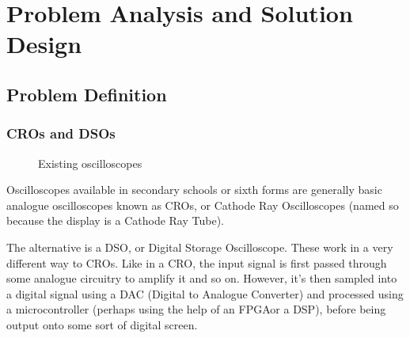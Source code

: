 \chapter{Problem Analysis and Solution Design}
\section{Problem Definition}
\subsection*{CROs and DSOs}

\begin{figure}[h]
  \centering
  \hfill
  \caption{Existing oscilloscopes\autocite{CROPhoto,DSOPhoto}}
\end{figure}

Oscilloscopes available in secondary schools or sixth forms are generally basic
analogue oscilloscopes known as CROs, or Cathode Ray Oscilloscopes (named so
because the display is a Cathode Ray Tube).~\autocite{DoctronicsScopes}

The alternative is a DSO, or Digital Storage Oscilloscope. These work in a very
different way to CROs. Like in a CRO, the input signal is first passed through
some analogue circuitry to amplify it and so on. However, it's then sampled
into a digital signal using a DAC (Digital to Analogue Converter) and processed
using a microcontroller (perhaps using the help of an FPGA\fdeffpga or a
DSP), before
being output onto some sort of digital screen.~\autocite{TiePieScopes}

